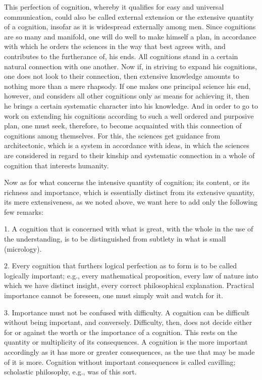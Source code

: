     This perfection of cognition, whereby it qualifies for easy and universal
    communication, could also be called external extension or the extensive
    quantity of a cognition, insofar as it is widespread externally among men.
    Since cognitions are so many and manifold, one will do well to make
    himself a plan, in accordance with which he orders the sciences in the way
    that best agrees with, and contributes to the furtherance of, his ends. All
    cognitions stand in a certain natural connection with one another. Now if,
    in striving to expand his cognitions, one does not look to their connection,
    then extensive knowledge amounts to nothing more than a mere rhapsody.
    If one makes one principal science his end, however, and
    considers all other cognitions only as means for achieving it,
    then he brings a certain systematic character into his knowledge.
    And in order to go to work on extending his cognitions
    according to such a well ordered and purposive plan,
    one must seek, therefore, to become acquainted with
    this connection of cognitions among themselves.
    For this, the sciences get guidance from architectonic,
    which is a system in accordance with ideas,
    in which the sciences are considered in regard to their kinship and
    systematic connection in a whole of cognition that interests humanity.

    Now as for what concerns the intensive quantity of cognition;
    its content, or its richness and importance,
    which is essentially distinct from its extensive quantity,
    its mere extensiveness, as we noted above,
    we want here to add only the following few remarks:

    1. A cognition that is concerned with what is great,
    with the whole in the use of the understanding,
    is to be distinguished from subtlety in what is small (micrology).

    2. Every cognition that furthers logical perfection
    as to form is to be called logically important;
    e.g., every mathematical proposition, every law of nature
    into which we have distinct insight, every correct philosophical explanation.
    Practical importance cannot be foreseen, one must simply wait and watch for it.

    3. Importance must not be confused with difficulty.
    A cognition can be difficult without being important, and conversely.
    Difficulty, then, does not decide either for or against
    the worth or the importance of a cognition.
    This rests on the quantity or multiplicity of its consequences.
    A cognition is the more important accordingly as
    it has more or greater consequences, as the use that
    may be made of it is more.
    Cognition without important consequences is called cavilling;
    scholastic philosophy, e.g., was of this sort.

